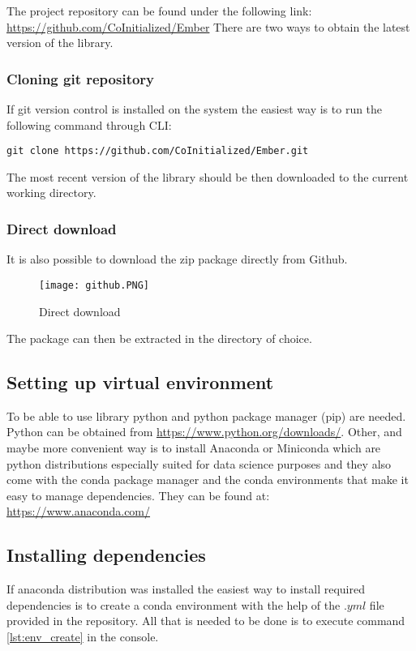 \documentclass[a4paper,twoside,12pt]{book}
\begin{document}
The project repository can be found under the following link: \url{https://github.com/CoInitialized/Ember}
There are two ways to obtain the latest version of the library.
\subsubsection{Cloning git repository}
If git version control is installed on the system the easiest way is to run the following command through CLI:
\begin{verbatim}
git clone https://github.com/CoInitialized/Ember.git
\end{verbatim}
The most recent version of the library should be then downloaded to the current working directory.
\subsubsection{Direct download}
It is also possible to download the zip package directly from Github.

\begin{figure}[!htb]
    \centering
    \texttt{[image: github.PNG]}
    \caption{Direct download}
    \label{fig:mesh1}
\end{figure}

The package can then be extracted in the directory of choice.


\subsection{Setting up virtual environment}

To be able to use library python and python package manager (pip) are needed.
Python can be obtained from \url{https://www.python.org/downloads/}. 
Other, and maybe more convenient way is to install Anaconda or Miniconda which are python distributions especially suited for data science purposes and they also come with the conda package manager and the conda environments that make it easy to manage dependencies. They can be found at: 
\url{https://www.anaconda.com/}

\subsection{Installing dependencies}

If anaconda distribution was installed the easiest way to install required dependencies is to create a conda environment with the help of the $.yml$ file provided in the repository. All that is needed to be done is to execute command \ref{lst:env_create} in the console.
\end{document}
